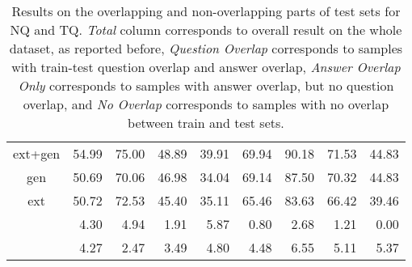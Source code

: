 \documentclass[11pt]{article}
\begin{document}
\begin{table*}
\begin{tabular}{c|rrrr|rrrr}
ext+gen               & 54.99                            & 75.00                                                  & 48.89                                                                                                    & 39.91                                                                                                   & 69.94                            & 90.18                                                                                        & 71.53                                                                                                    & 44.83                                                                                                  \\
gen                   & 50.69                            & 70.06                                                  & 46.98                                                                                                    & 34.04                                                                                                   & 69.14                            & 87.50                                                                                        & 70.32                                                                                                    & 44.83                                                                                                  \\
ext                   & 50.72                            & 72.53                                                  & 45.40                                                                                                    & 35.11                                                                                                   & 65.46                            & 83.63                                                                                        & 66.42                                                                                                    & 39.46                                                                                                  \\ \midrule
 & 4.30 & 4.94 & 1.91 & 5.87 & 0.80 & 2.68 & 1.21 & 0.00 \\
 & 4.27 & 2.47 & 3.49 & 4.80 & 4.48 & 6.55 & 5.11 & 5.37 \\
\bottomrule
\end{tabular}     \caption{Results on the overlapping and non-overlapping parts of test sets for NQ and TQ. \textit{Total} column corresponds to overall result on the whole dataset, as reported before,  \textit{Question Overlap} corresponds to samples with train-test question overlap and answer overlap, \textit{Answer Overlap Only} corresponds to samples with answer overlap, but no question overlap, and \textit{No Overlap} corresponds to samples with no overlap between train and test sets.}
    \label{tab:results_overlap_subsets}
\end{table*}
\end{document}
